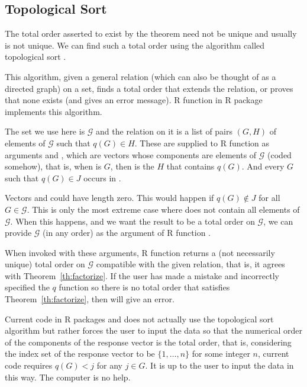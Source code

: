 \subsection{Topological Sort}

The total order asserted to exist by the theorem need not be unique and
usually is not unique.
We can find such a total order using the algorithm called topological sort
\citep*[Section~6.6]{aho-et-al}.

This algorithm, given a general relation (which can also be thought of as
a directed graph) on a set, finds a total order that
extends the relation, or proves that none exists (and gives an error
message).
R function  in R package 
\citep{pooh-package} implements this algorithm.

The set we use here is $\mathcal{G}$ and the relation on it is
a list of pairs $(G, H)$ of elements of $\mathcal{G}$ such that
$q(G) \in H$.  These are supplied to R function  as arguments
 and , which are vectors whose components are elements
of $\mathcal{G}$ (coded somehow), that is, when 
is $G$, then  is the $H$ that contains $q(G)$.
And every $G$ such that $q(G) \in J$ occurs in .

Vectors  and  could have length zero.  This would happen
if $q(G) \notin J$ for all $G \in \mathcal{G}$.  This is only the most extreme
case where  does not contain all elements of $\mathcal{G}$.
When this happens, and we want the result to be a total order on $\mathcal{G}$,
we can provide $\mathcal{G}$ (in any order) as the  argument of
R function .

When invoked with these arguments, R function  returns
a (not necessarily unique) total order on $\mathcal{G}$ compatible with
the given relation, that is, it agrees with
Theorem~\ref{th:factorize}.  If the user has made a mistake and incorrectly
specified the $q$ function so there is no total order that satisfies
Theorem~\ref{th:factorize}, then  will give an error.

Current code in R packages  and  does not
actually use the topological sort algorithm but rather forces the user
to input the data so that the numerical order of the components of the
response vector is the total order, that is, considering the index set
of the response vector to be $\{1, \ldots, n\}$ for some integer $n$,
current code requires $q(G) < j$ for any $j \in G$.
It is up to the user to input the data in this way.  The computer is no help.

